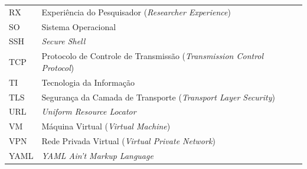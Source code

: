 \begin{longtable}{ll}
        RX & Experiência do Pesquisador (\emph{Researcher Experience}) \\
        SO & Sistema Operacional \\
        SSH & \emph{Secure Shell} \\
        TCP & Protocolo de Controle de Transmissão (\emph{Transmission Control Protocol}) \\
        TI & Tecnologia da Informação \\
        TLS & Segurança da Camada de Transporte (\emph{Transport Layer Security}) \\
        URL & \emph{Uniform Resource Locator} \\
        VM	& Máquina Virtual (\emph{Virtual Machine}) \\
        VPN & Rede Privada Virtual (\emph{Virtual Private Network}) \\
        YAML & \emph{YAML Ain't Markup Language} \\
\end{longtable}
